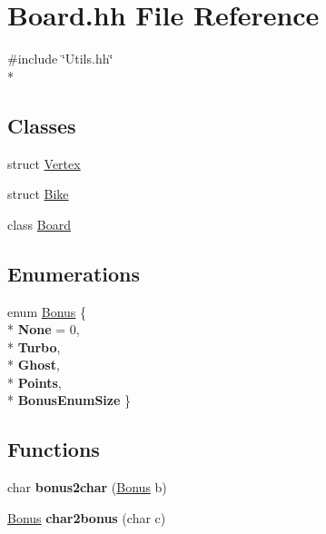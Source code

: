\hypertarget{Board_8hh}{}\section{Board.\+hh File Reference}
\label{Board_8hh}
{\ttfamily \#include \char`\"{}Utils.\+hh\char`\"{}}\\*
\subsection*{Classes}
\begin{DoxyCompactItemize}
\item 
struct \hyperlink{structVertex}{Vertex}
\item 
struct \hyperlink{structBike}{Bike}
\item 
class \hyperlink{classBoard}{Board}
\end{DoxyCompactItemize}
\subsection*{Enumerations}
\begin{DoxyCompactItemize}
\item 
enum \hyperlink{Board_8hh_a89fd84d2116e79c08d57dffb6d167ec2}{Bonus} \{ \\*
{\bfseries None} = 0, 
\\*
{\bfseries Turbo}, 
\\*
{\bfseries Ghost}, 
\\*
{\bfseries Points}, 
\\*
{\bfseries Bonus\+Enum\+Size}
 \}
\end{DoxyCompactItemize}
\subsection*{Functions}
\begin{DoxyCompactItemize}
\item 
char {\bfseries bonus2char} (\hyperlink{Board_8hh_a89fd84d2116e79c08d57dffb6d167ec2}{Bonus} b)\hypertarget{Board_8hh_a58214ea13c717183c9aa860a0c4e476a}{}\label{Board_8hh_a58214ea13c717183c9aa860a0c4e476a}

\item 
\hyperlink{Board_8hh_a89fd84d2116e79c08d57dffb6d167ec2}{Bonus} {\bfseries char2bonus} (char c)\hypertarget{Board_8hh_a9eac06fa5071b83c6e859428e9bba2c9}{}\label{Board_8hh_a9eac06fa5071b83c6e859428e9bba2c9}

\end{DoxyCompactItemize}


